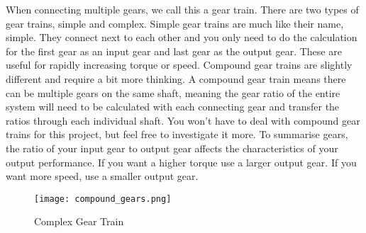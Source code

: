 \documentclass[../TinyBot.tex]{subfiles}
\begin{document}
When connecting multiple gears, we call this a gear train. There are two types of gear trains, simple and complex. Simple gear trains are much like their name, simple. They connect next to each other and you only need to do the calculation for the first gear as an input gear and last gear as the output gear. These are useful for rapidly increasing torque or speed. Compound gear trains are slightly different and require a bit more thinking. A compound gear train means there can be multiple gears on the same shaft, meaning the gear ratio of the entire system will need to be calculated with each connecting gear and transfer the ratios through each individual shaft. You won’t have to deal with compound gear trains for this project, but feel free to investigate it more.
To summarise gears, the ratio of your input gear to output gear affects the characteristics of your output performance. If you want a higher torque use a larger output gear. If you want more speed, use a smaller output gear.

\begin{figure}[h]
    \texttt{[image: compound\_gears.png]}
    \label{fig:gear-complex}
    \caption{Complex Gear Train}
\end{figure}
\end{document}
